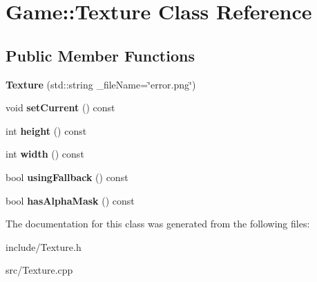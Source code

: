 \hypertarget{classGame_1_1Texture}{\section{Game\-:\-:Texture Class Reference}
\label{classGame_1_1Texture}
}
\subsection*{Public Member Functions}
\begin{DoxyCompactItemize}
\item 
\hypertarget{classGame_1_1Texture_acac6416348c813de1880849783641411}{{\bfseries Texture} (std\-::string \-\_\-file\-Name=\char`\"{}error.\-png\char`\"{})}\label{classGame_1_1Texture_acac6416348c813de1880849783641411}

\item 
\hypertarget{classGame_1_1Texture_adde1eb3a23ff2ca540384845050ec9b1}{void {\bfseries set\-Current} () const }\label{classGame_1_1Texture_adde1eb3a23ff2ca540384845050ec9b1}

\item 
\hypertarget{classGame_1_1Texture_a2b45418d0efa24d24e44028b8792e489}{int {\bfseries height} () const }\label{classGame_1_1Texture_a2b45418d0efa24d24e44028b8792e489}

\item 
\hypertarget{classGame_1_1Texture_ab80379a37a8de7f53a28a1ee8bd1e5a2}{int {\bfseries width} () const }\label{classGame_1_1Texture_ab80379a37a8de7f53a28a1ee8bd1e5a2}

\item 
\hypertarget{classGame_1_1Texture_ad6c25d9e584729ea78dfd6ac20e7f17f}{bool {\bfseries using\-Fallback} () const }\label{classGame_1_1Texture_ad6c25d9e584729ea78dfd6ac20e7f17f}

\item 
\hypertarget{classGame_1_1Texture_ae85b520ce04b5a0a6d74ef3d0517c6fc}{bool {\bfseries has\-Alpha\-Mask} () const }\label{classGame_1_1Texture_ae85b520ce04b5a0a6d74ef3d0517c6fc}

\end{DoxyCompactItemize}


The documentation for this class was generated from the following files\-:\begin{DoxyCompactItemize}
\item 
include/Texture.\-h\item 
src/Texture.\-cpp\end{DoxyCompactItemize}
